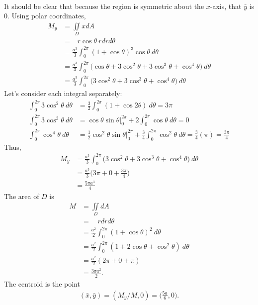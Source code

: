 \item %
 \\
It should be clear that because the region is symmetric about the $x$-axis, that $\bar{y}$ is 0. Using polar coordinates,
\begin{align*}
  M_y 
  &=  \iint\limits_D x dA \\
  &=  \mathop{\int_{0}^{2\pi} \!\! \int_{0}^{a(1+\cos\theta)}} r\cos\theta  \ rdrd\theta \\
  &=  \frac{a^3}{3} \int_{0}^{2\pi}  (1+\cos\theta)^3 \cos\theta  \ d\theta \\
  &=  \frac{a^3}{3} \int_{0}^{2\pi}  \big(\cos \theta+3\cos^2\theta +3 \cos^3\theta +\cos^4\theta \big) \ d\theta \\
  &=  \frac{a^3}{3} \int_{0}^{2\pi}  \big(3\cos^2\theta +3 \cos^3\theta +\cos^4\theta \big) \ d\theta 
\end{align*}
Let's consider each integral separately:
\begin{align*}
 \int_{0}^{2\pi} 3\cos^2\theta \ d\theta &= \frac{3}{2} \int_{0}^{2\pi} (1 + \cos2\theta )\ d\theta = 3\pi \\
 \int_{0}^{2\pi} 3\cos^3\theta \ d\theta &= \cos\theta \sin\theta \Big|_{0}^{2\pi} + 2 \int_{0}^{2\pi}  \cos\theta \ d\theta = 0 \\
 \int_{0}^{2\pi} \cos^4\theta \ d\theta &= \frac{1}{2}\cos^2\theta \sin\theta \Big|_{0}^{2\pi} + \frac{3}{4} \int_{0}^{2\pi}  \cos^2\theta \ d\theta = \frac{3}{4}(\pi) =\frac{3\pi}{4}
\end{align*}
Thus,
\begin{align*}
  M_y 
  &=  \frac{a^3}{3} \int_{0}^{2\pi}  \big(3\cos^2\theta +3 \cos^3\theta +\cos^4\theta \big) \ d\theta \\
  &=  \frac{a^3}{3} \Big(3\pi + 0 + \frac{3\pi}{4}\Big) \\
  &= \frac{5\pi a^3}{4}
\end{align*}
The area of $D$ is 
\begin{align*}
  M
  &=  \iint\limits_D dA \\
  &=  \mathop{\int_{0}^{2\pi} \!\! \int_{0}^{a(1+\cos\theta)}} \ rdrd\theta \\
  &=  \frac{a^2}{2} \int_{0}^{2\pi}  (1+\cos\theta)^2  \ d\theta \\
  &=  \frac{a^2}{2} \int_{0}^{2\pi}  (1+2\cos\theta+\cos^2\theta)  \ d\theta \\
  &=  \frac{a^2}{2} (2\pi+0+\pi)  \\
  &=  \frac{3\pi a^2}{2} .
\end{align*}
The centroid is the point
\begin{align*}
(\bar{x},\bar{y}) = (M_y/M, 0) = \Bigg(\frac{5a}{6},0\Bigg).
\end{align*}


\EEN %
